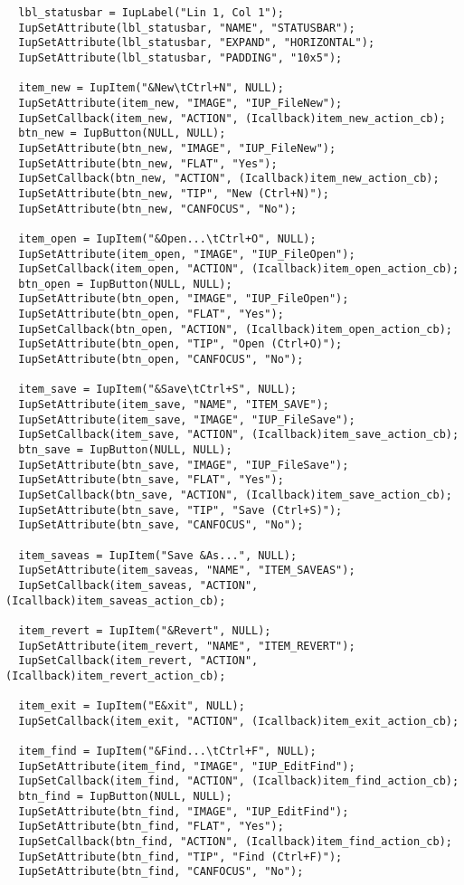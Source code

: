 \documentclass{ctexart}
\begin{document}
\begin{lstlisting}
  lbl_statusbar = IupLabel("Lin 1, Col 1");
  IupSetAttribute(lbl_statusbar, "NAME", "STATUSBAR");
  IupSetAttribute(lbl_statusbar, "EXPAND", "HORIZONTAL");
  IupSetAttribute(lbl_statusbar, "PADDING", "10x5");

  item_new = IupItem("&New\tCtrl+N", NULL);
  IupSetAttribute(item_new, "IMAGE", "IUP_FileNew");
  IupSetCallback(item_new, "ACTION", (Icallback)item_new_action_cb);
  btn_new = IupButton(NULL, NULL);
  IupSetAttribute(btn_new, "IMAGE", "IUP_FileNew");
  IupSetAttribute(btn_new, "FLAT", "Yes");
  IupSetCallback(btn_new, "ACTION", (Icallback)item_new_action_cb);
  IupSetAttribute(btn_new, "TIP", "New (Ctrl+N)");
  IupSetAttribute(btn_new, "CANFOCUS", "No");

  item_open = IupItem("&Open...\tCtrl+O", NULL);
  IupSetAttribute(item_open, "IMAGE", "IUP_FileOpen");
  IupSetCallback(item_open, "ACTION", (Icallback)item_open_action_cb);
  btn_open = IupButton(NULL, NULL);
  IupSetAttribute(btn_open, "IMAGE", "IUP_FileOpen");
  IupSetAttribute(btn_open, "FLAT", "Yes");
  IupSetCallback(btn_open, "ACTION", (Icallback)item_open_action_cb);
  IupSetAttribute(btn_open, "TIP", "Open (Ctrl+O)");
  IupSetAttribute(btn_open, "CANFOCUS", "No");

  item_save = IupItem("&Save\tCtrl+S", NULL);
  IupSetAttribute(item_save, "NAME", "ITEM_SAVE");
  IupSetAttribute(item_save, "IMAGE", "IUP_FileSave");
  IupSetCallback(item_save, "ACTION", (Icallback)item_save_action_cb);
  btn_save = IupButton(NULL, NULL);
  IupSetAttribute(btn_save, "IMAGE", "IUP_FileSave");
  IupSetAttribute(btn_save, "FLAT", "Yes");
  IupSetCallback(btn_save, "ACTION", (Icallback)item_save_action_cb);
  IupSetAttribute(btn_save, "TIP", "Save (Ctrl+S)");
  IupSetAttribute(btn_save, "CANFOCUS", "No");

  item_saveas = IupItem("Save &As...", NULL);
  IupSetAttribute(item_saveas, "NAME", "ITEM_SAVEAS");
  IupSetCallback(item_saveas, "ACTION", (Icallback)item_saveas_action_cb);

  item_revert = IupItem("&Revert", NULL);
  IupSetAttribute(item_revert, "NAME", "ITEM_REVERT");
  IupSetCallback(item_revert, "ACTION", (Icallback)item_revert_action_cb);

  item_exit = IupItem("E&xit", NULL);
  IupSetCallback(item_exit, "ACTION", (Icallback)item_exit_action_cb);

  item_find = IupItem("&Find...\tCtrl+F", NULL);
  IupSetAttribute(item_find, "IMAGE", "IUP_EditFind");
  IupSetCallback(item_find, "ACTION", (Icallback)item_find_action_cb);
  btn_find = IupButton(NULL, NULL);
  IupSetAttribute(btn_find, "IMAGE", "IUP_EditFind");
  IupSetAttribute(btn_find, "FLAT", "Yes");
  IupSetCallback(btn_find, "ACTION", (Icallback)item_find_action_cb);
  IupSetAttribute(btn_find, "TIP", "Find (Ctrl+F)");
  IupSetAttribute(btn_find, "CANFOCUS", "No");


\end{lstlisting}
\end{document}
